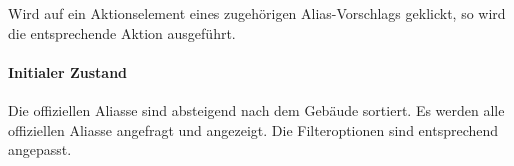 Wird auf ein Aktionselement eines zugehörigen Alias-Vorschlags geklickt, so wird die entsprechende Aktion ausgeführt.

\paragraph*{Initialer Zustand}
Die offiziellen Aliasse sind absteigend nach dem Gebäude sortiert.
Es werden alle offiziellen Aliasse angefragt und angezeigt.
Die Filteroptionen sind entsprechend angepasst.